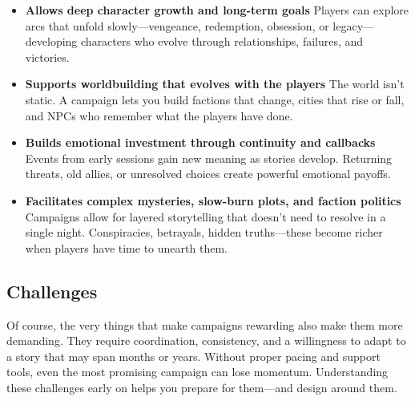 \begin{itemize}\raggedright
    \item \textbf{Allows deep character growth and long-term goals}  
    Players can explore arcs that unfold slowly—vengeance, redemption, obsession, or legacy—developing characters who evolve through relationships, failures, and victories.

    \item \textbf{Supports worldbuilding that evolves with the players}  
    The world isn’t static. A campaign lets you build factions that change, cities that rise or fall, and NPCs who remember what the players have done.

    \item \textbf{Builds emotional investment through continuity and callbacks}  
    Events from early sessions gain new meaning as stories develop. Returning threats, old allies, or unresolved choices create powerful emotional payoffs.

    \item \textbf{Facilitates complex mysteries, slow-burn plots, and faction politics}  
    Campaigns allow for layered storytelling that doesn’t need to resolve in a single night. Conspiracies, betrayals, hidden truths—these become richer when players have time to unearth them.
\end{itemize}

\subsection*{Challenges}

Of course, the very things that make campaigns rewarding also make them more demanding. They require coordination, consistency, and a willingness to adapt to a story that may span months or years. Without proper pacing and support tools, even the most promising campaign can lose momentum. Understanding these challenges early on helps you prepare for them—and design around them.


